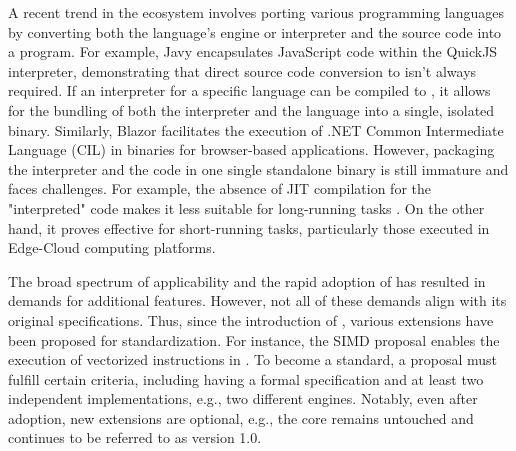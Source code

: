 A recent trend in the \Wasm ecosystem involves porting various programming languages by converting both the language's engine or interpreter and the source code into a \Wasm program. 
For example, Javy encapsulates JavaScript code within the QuickJS interpreter, demonstrating that direct source code conversion to \Wasm isn't always required. 
If an interpreter for a specific language can be compiled to \Wasm, it allows for the bundling of both the interpreter and the language into a single, isolated \Wasm binary. 
Similarly, Blazor facilitates the execution of .NET Common Intermediate Language (CIL) in \Wasm binaries for browser-based applications. 
However, packaging the interpreter and the code in one single standalone \Wasm binary is still immature and faces challenges.
For example, the absence of JIT compilation for the "interpreted" code makes it less suitable for long-running tasks \cite{10.1145/3593434.3593454}. 
On the other hand, it proves effective for short-running tasks, particularly those executed in Edge-Cloud computing platforms.




The broad spectrum of applicability and the rapid adoption of \Wasm has resulted in demands for additional features. 
However, not all of these demands align with its original specifications.
Thus, since the introduction of \Wasm, various extensions have been proposed for standardization. 
For instance, the SIMD proposal enables the execution of vectorized instructions in \Wasm. 
To become a standard, a proposal must fulfill certain criteria, including having a formal specification and at least two independent implementations, e.g., two different engines. 
Notably, even after adoption, new extensions are optional, e.g., the core \Wasm remains untouched and continues to be referred to as version 1.0. 


\label{background:wasm:binary}

